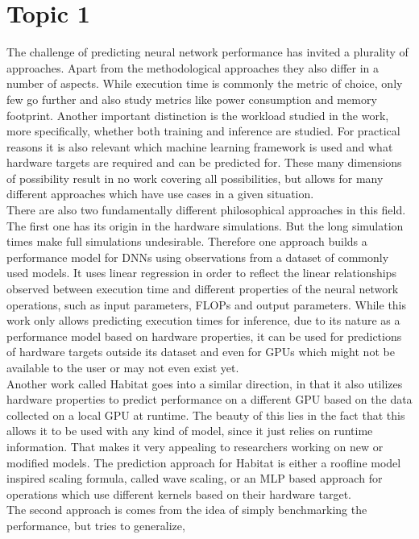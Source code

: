 \section{Topic 1}
The challenge of predicting neural network performance has invited a plurality of approaches.
Apart from the methodological approaches they also differ in a number of aspects.
While execution time is commonly the metric of choice, only few go further and also study metrics
like power consumption and memory footprint. Another important distinction is the workload studied
in the work, more specifically, whether both training and inference are studied.
For practical reasons it is also relevant which machine learning framework is used and what hardware
targets are required and can be predicted for. These many dimensions of possibility result in no work
covering all possibilities, but allows for many different approaches which have use cases in a given
situation.\\
There are also two fundamentally different philosophical approaches in this field. The first one has
its origin in the hardware simulations. But the long simulation times make full simulations undesirable.
Therefore one approach builds a performance model for DNNs using observations from a dataset of commonly
used models. It uses linear regression in order to reflect the linear
relationships observed between execution time and different properties of the
neural network operations, such as input parameters, FLOPs and output parameters. While this work only
allows predicting execution times for inference, due to its nature as a performance model based
on hardware properties, it can be used for predictions of hardware targets outside its dataset and 
even for GPUs which might not be available to the user or may not even exist yet. \\
Another work called Habitat goes into a similar direction, in that it also utilizes hardware properties to 
predict performance on a different GPU based on the data collected on a local GPU at runtime. The beauty
of this lies in the fact that this allows it to be used with any kind of model, since it just relies on 
runtime information. That makes it very appealing to researchers working on new or modified models.
The prediction approach for Habitat is either a roofline model inspired scaling formula, called wave
scaling, or an MLP based approach for operations which use different kernels based on their hardware
target. \\
The second approach is comes from the idea of simply benchmarking the performance, but tries to generalize,
